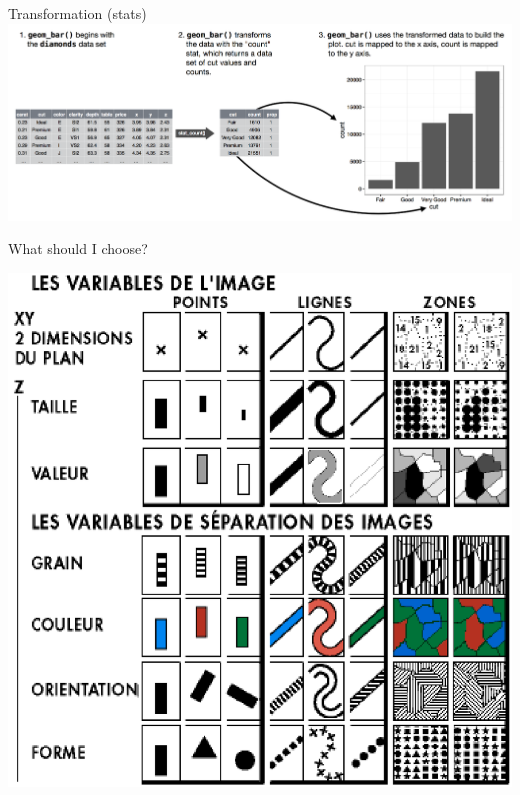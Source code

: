 \documentclass[xcolor=table,aspectratio=169]{beamer}
\newcommand{\referto}[1]{\hfill{\scriptsize{\emph{\color{gray}{#1}}}}}
\begin{document}
\begin{frame}{Transformation (stats)}
  \includegraphics[width=\textwidth]{pics/hadley-stats.png}
\end{frame}

\begin{frame}
  What should I choose?
\end{frame}

\begin{frame}
  \includegraphics[height=\textheight]{pics/bertin.png} \referto{Jacques Bertin (1967) Sémiologie graphique}
\end{frame}
\end{document}
